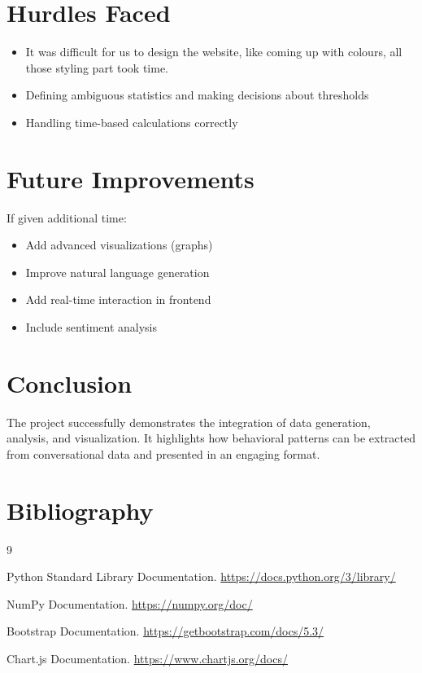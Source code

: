 \documentclass[12pt]{article}
\begin{document}
\section{Hurdles Faced}

\begin{itemize}
\item It was difficult for us to design the website, like coming up with colours, all those styling part took time.
\item Defining ambiguous statistics and making decisions about thresholds
\item Handling time-based calculations correctly
\end{itemize}

\section{Future Improvements}

If given additional time:

\begin{itemize}
\item Add advanced visualizations (graphs)
\item Improve natural language generation
\item Add real-time interaction in frontend
\item Include sentiment analysis
\end{itemize}

\section{Conclusion}

The project successfully demonstrates the integration of data generation, analysis, and visualization. It highlights how behavioral patterns can be extracted from conversational data and presented in an engaging format.

\section{Bibliography}

\begin{thebibliography}{9}

Python Standard Library Documentation.
\url{https://docs.python.org/3/library/}

NumPy Documentation.
\url{https://numpy.org/doc/}

Bootstrap Documentation.
\url{https://getbootstrap.com/docs/5.3/}

Chart.js Documentation.
\url{https://www.chartjs.org/docs/}


\end{thebibliography}
\end{document}
